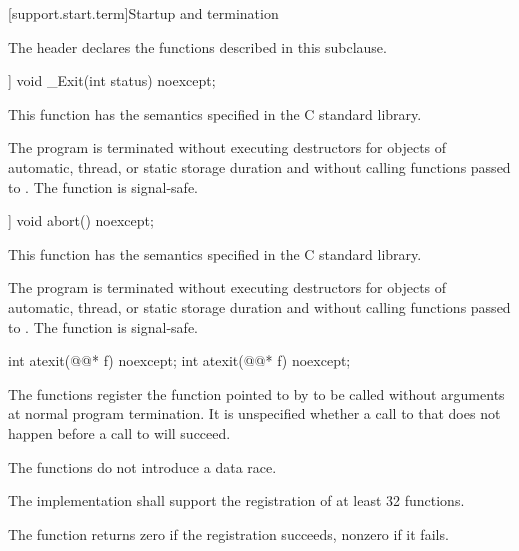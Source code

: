 [support.start.term]{Startup and termination}

\pnum
\begin{note}
The header 
declares the functions described in this subclause.
\end{note}

%
\begin{itemdecl}
[[noreturn]] void _Exit(int status) noexcept;
\end{itemdecl}

\begin{itemdescr}
\pnum
\effects
This function has the semantics specified in the C standard library.

\pnum
\remarks
The program is terminated without executing destructors for objects of automatic,
thread, or static storage duration and without calling functions passed to
.
%
The function  is signal-safe.
\end{itemdescr}

%
\begin{itemdecl}
[[noreturn]] void abort() noexcept;
\end{itemdecl}

\begin{itemdescr}
\pnum
\effects
This function has the semantics specified in the C standard library.

\pnum
\remarks
The program is terminated without executing destructors for objects of
automatic, thread, or static storage
duration and without calling functions passed to
.
%
The function  is signal-safe.
\end{itemdescr}

%
\begin{itemdecl}
int atexit(@@* f) noexcept;
int atexit(@@* f) noexcept;
\end{itemdecl}

\begin{itemdescr}
\pnum
\effects
The
functions register the function pointed to by 
to be called without arguments at normal program termination.
It is unspecified whether a call to  that does not
happen before a call to  will succeed.
\begin{note}
The  functions do not introduce a data
race.
\end{note}

\pnum
\implimits
The implementation shall support the registration of at least 32 functions.

\pnum
\returns
The
function returns zero if the registration succeeds,
nonzero if it fails.
\end{itemdescr}

